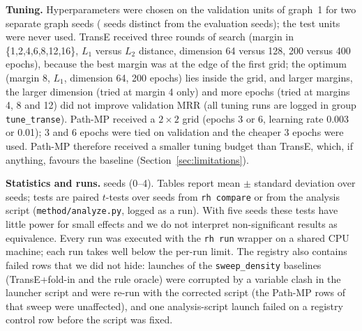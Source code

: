 \vspace{4pt}\noindent\textbf{Tuning.} Hyperparameters were chosen on the validation units of graph~1 for two separate graph seeds ( seeds distinct from the evaluation seeds); the test units were never used. TransE received three rounds of search (margin in \{1,2,4,6,8,12,16\}, $L_1$ versus $L_2$ distance, dimension 64 versus 128, 200 versus 400 epochs), because the best margin was at the edge of the first grid; the optimum (margin 8, $L_1$, dimension 64, 200 epochs) lies inside the grid, and larger margins, the larger dimension (tried at margin 4 only) and more epochs (tried at margins 4, 8 and 12) did not improve validation MRR (all  tuning runs are logged in group \texttt{tune\_transe}). Path-MP received a $2\times2$ grid (epochs 3 or 6, learning rate 0.003 or 0.01); 3 and 6 epochs were tied on validation and the cheaper 3 epochs were used. Path-MP therefore received a smaller tuning budget than TransE, which, if anything, favours the baseline (Section~\ref{sec:limitations}).

\vspace{4pt}\noindent\textbf{Statistics and runs.}  seeds (0--4). Tables report mean $\pm$ standard deviation over seeds; tests are paired $t$-tests over seeds from \texttt{rh compare} or from the analysis script (\texttt{method/analyze.py}, logged as a run). With five seeds these tests have little power for small effects and we do not interpret non-significant results as equivalence. Every run was executed with the \texttt{rh run} wrapper on a shared CPU machine; each run takes well below the per-run limit. The registry also contains failed rows that we did not hide:  launches of the \texttt{sweep\_density} baselines (TransE+fold-in and the rule oracle) were corrupted by a variable clash in the launcher script and were re-run with the corrected script (the Path-MP rows of that sweep were unaffected), and one analysis-script launch failed on a registry control row before the script was fixed.
